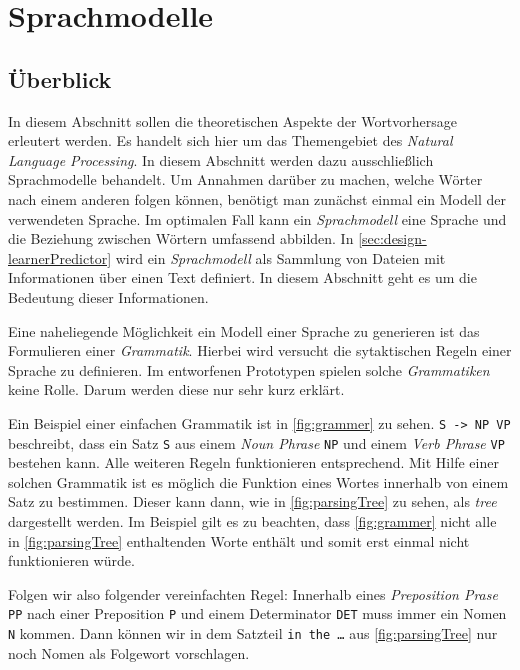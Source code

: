 \section{Sprachmodelle}

    \subsection{Überblick}
    \label{sec:langmodels}
    	In diesem Abschnitt sollen die theoretischen Aspekte der Wortvorhersage erleutert werden. Es handelt sich hier um das Themengebiet des \emph{Natural Language Processing}. In diesem Abschnitt werden dazu ausschließlich Sprachmodelle behandelt. Um Annahmen darüber zu machen, welche Wörter nach einem anderen folgen können, benötigt man zunächst einmal ein Modell der verwendeten Sprache. Im optimalen Fall kann ein \emph{Sprachmodell} eine Sprache und die Beziehung zwischen Wörtern umfassend abbilden. In \autoref{sec:design-learnerPredictor} wird ein \emph{Sprachmodell} als Sammlung von Dateien mit Informationen über einen Text definiert. In diesem Abschnitt geht es um die Bedeutung dieser Informationen.
        
        Eine naheliegende Möglichkeit ein Modell einer Sprache zu generieren ist das Formulieren einer \emph{Grammatik}. Hierbei wird versucht die sytaktischen Regeln einer Sprache zu definieren. Im entworfenen Prototypen spielen solche \emph{Grammatiken} keine Rolle. Darum werden diese nur sehr kurz erklärt.
        
        Ein Beispiel einer einfachen Grammatik ist in \autoref{fig:grammer} zu sehen. \texttt{S -> NP VP} beschreibt, dass ein Satz \texttt{S} aus einem \emph{Noun Phrase} \texttt{NP} und einem \emph{Verb Phrase} \texttt{VP} bestehen kann. Alle weiteren Regeln funktionieren entsprechend. Mit Hilfe einer solchen Grammatik ist es möglich die Funktion eines Wortes innerhalb von einem Satz zu bestimmen. Dieser kann dann, wie in \autoref{fig:parsingTree} zu sehen,  als \emph{tree} dargestellt werden. Im Beispiel gilt es zu beachten, dass \autoref{fig:grammer} nicht alle in \autoref{fig:parsingTree} enthaltenden Worte enthält und somit erst einmal nicht funktionieren würde.
        
        Folgen wir also folgender vereinfachten Regel: Innerhalb eines \emph{Preposition Prase} \texttt{PP} nach einer Preposition \texttt{P} und einem Determinator \texttt{DET} muss immer ein Nomen \texttt{N} kommen. Dann können wir in dem Satzteil \texttt{in the …} aus \autoref{fig:parsingTree} nur noch Nomen als Folgewort vorschlagen.
        
